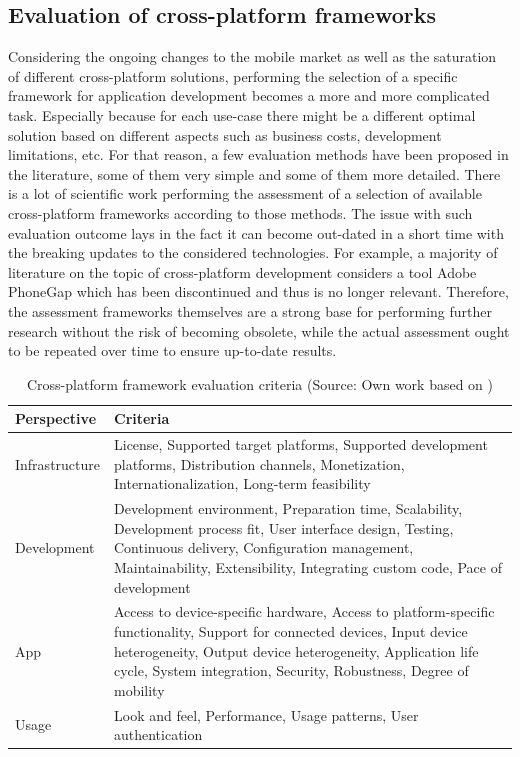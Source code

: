 \subsection{Evaluation of cross-platform frameworks}

Considering the ongoing changes to the mobile market as well as the saturation of different cross-platform solutions, performing the selection of a specific framework for application development becomes a more and more complicated task. Especially because for each use-case there might be a different optimal solution based on different aspects such as business costs, development limitations, etc. For that reason, a few evaluation methods have been proposed in the literature, some of them very simple and some of them more detailed. There is a lot of scientific work performing the assessment of a selection of available cross-platform frameworks according to those methods. The issue with such evaluation outcome lays in the fact it can become out-dated in a short time with the breaking updates to the considered technologies. For example, a majority of literature on the topic of cross-platform development considers a tool Adobe PhoneGap which has been discontinued and thus is no longer relevant. Therefore, the assessment frameworks themselves are a strong base for performing further research  without the risk of becoming obsolete, while the actual assessment ought to be repeated over time to ensure up-to-date results.

\begin{table}[h]
    \centering
    \caption{Cross-platform framework evaluation criteria (Source: Own work based on \cite{rieger_eval_cp})}
    \label{tab:eval_criteria}
    \begin{tabular}{ |l|p{}| }
        \hline
        \textbf{Perspective}&\textbf{Criteria}\\
        \hline
        Infrastructure&License, Supported target platforms, Supported development platforms, Distribution channels, Monetization, Internationalization, Long-term feasibility\\
        \hline
        Development&Development environment, Preparation time, Scalability, Development process fit, User interface design, Testing, Continuous delivery, Configuration management, Maintainability, Extensibility, Integrating custom code, Pace of development\\
        \hline
        App&Access to device-specific hardware, Access to platform-specific functionality, Support for connected devices, Input device heterogeneity, Output device heterogeneity, Application life cycle, System integration, Security, Robustness, Degree of mobility \\
        \hline
        Usage&Look and feel, Performance, Usage patterns, User authentication\\
        \hline
    \end{tabular}
\end{table}

